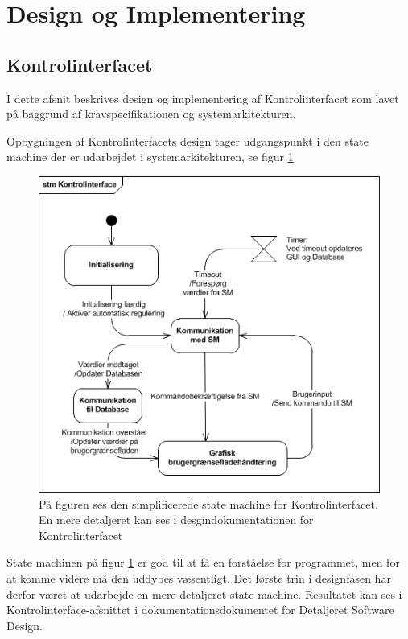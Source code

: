 \section{Design og Implementering}
\label{ch:DesignImplementering}

\subsection{Kontrolinterfacet}
I dette afsnit beskrives design og implementering af Kontrolinterfacet som lavet på baggrund af kravspecifikationen og systemarkitekturen. 

Opbygningen af Kontrolinterfacets design tager udgangspunkt i den state machine der er udarbejdet i systemarkitekturen, se figur \ref{fig:KI-stm}

\begin{figure}[htbp]
\centering
\label{fig:KI-stm}
\includegraphics[width=1\textwidth]{billeder/KI/stm_ki}
\caption{På figuren ses den simplificerede state machine for Kontrolinterfacet. En mere detaljeret kan ses i desgindokumentationen for Kontrolinterfacet}
\end{figure}

State machinen på figur \ref{fig:KI-stm} er god til at få en forståelse for programmet, men for at komme videre må den uddybes væsentligt. Det første trin i designfasen har derfor været at udarbejde en mere detaljeret state machine. Resultatet kan ses i Kontrolinterface-afsnittet i dokumentationsdokumentet for Detaljeret Software Design.

